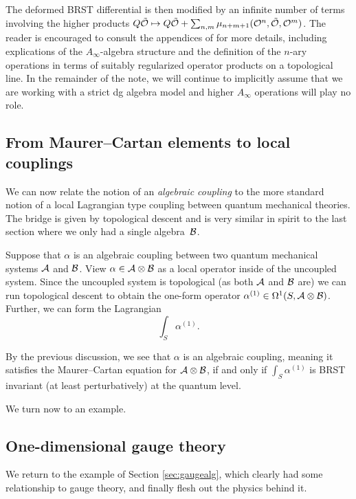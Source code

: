 \documentclass[11pt]{amsart}
\def\natalie#1{{\textcolor{green!65!black}{NMP: {#1}}}}
\begin{document}
The deformed BRST differential is then modified by an infinite number of terms involving the higher products $Q \tilde{\mathcal O} \mapsto Q \tilde{\mathcal O} + \sum_{n, m}\mu_{n + m + 1}(\mathcal O^n, \tilde{\mathcal O}, \mathcal O^m)$. The reader is encouraged to consult the appendices of \cite{GO} for more details, including explications of the $A_\infty$-algebra structure and the definition of the $n$-ary operations in terms of suitably regularized operator products on a topological line. 
In the remainder of the note, we will continue to implicitly assume that we are working with a strict dg algebra model and higher $A_\infty$ operations will play no role.



\subsection{From Maurer--Cartan elements to local couplings} 

We can now relate the notion of an {\em algebraic coupling} to the more standard notion of a local Lagrangian type coupling between quantum mechanical theories. 
The bridge is given by topological descent and is very similar in spirit to the last section where we only had a single algebra~$\mathcal B$. 

Suppose that $\alpha$ is an algebraic coupling between two quantum mechanical systems $\mathcal A$ and $\mathcal B$. 
View $\alpha \in \mathcal A \otimes \mathcal B$ as a local operator inside of the uncoupled system. 
Since the uncoupled system is topological (as both $\mathcal A$ and $\mathcal B$ are) we can run topological descent to obtain the one-form operator $\alpha^{(1)} \in \Omega^1 (S , \mathcal A \otimes \mathcal B)$.
Further, we can form the Lagrangian 
\[
 \int_S \alpha^{(1)} .\]

By the previous discussion, we see that $\alpha$ is an algebraic coupling, meaning it satisfies the Maurer--Cartan equation for $\mathcal A \otimes \mathcal B$, if and only if $\int_S \alpha^{(1)}$ is BRST invariant (at least perturbatively) at the quantum level.


We turn now to an example. 

\subsection{One-dimensional gauge theory}
\label{sec:gaugetheory}

We return to the example of Section \ref{sec:gaugealg}, which clearly had some relationship to gauge theory, and finally flesh out the physics behind it. 
\end{document}
